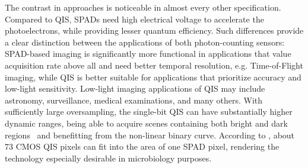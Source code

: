 The contrast in approaches is noticeable in almost every other specification. Compared to QIS, SPADs need high electrical voltage to accelerate the photoelectrons, while providing lesser quantum efficiency. Such differences provide a clear distinction between the applications of both photon-counting sensors: SPAD-based imaging is significantly more functional in applications that value acquisition rate above all and need better temporal resolution, e.g. Time-of-Flight imaging, while QIS is better suitable for applications that prioritize accuracy and low-light sensitivity. Low-light imaging applications of QIS may include astronomy, surveillance, medical examinations, and many others. With sufficiently large oversampling, the single-bit QIS can have substantially higher dynamic ranges, being able to acquire scenes containing both bright and dark regions~\cite{Feng_Yang_2012} and benefitting from the non-linear binary curve. According to \cite{9059308}, about 73 CMOS QIS pixels can fit into the area of one SPAD pixel, rendering the technology especially desirable in microbiology purposes.